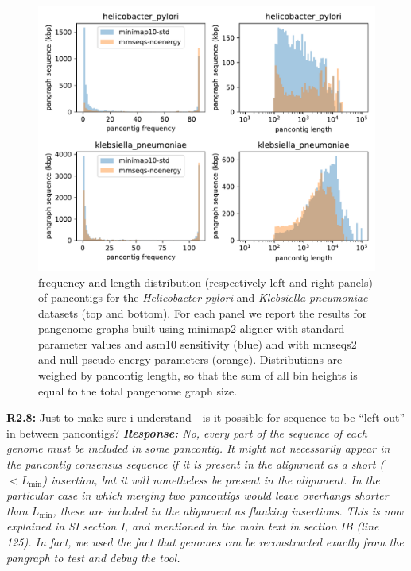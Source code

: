 \documentclass[aps,rmp,onecolumn]{revtex4-1}
\newcommand{\Lthr}{L_{\min}}
\newcommand{\reviewer}[2]{\textbf{#1:} #2\vskip 5mm}
\newcommand{\response}[1]{{\it {\color{response}\textbf{Response:} #1}}\vskip 5mm}
\newcommand{\SIgraph}{I}
\begin{document}
\begin{figure}[tb]
      \includegraphics[width=.7\textwidth]{figs_response/hp_vs_kp.pdf}
      \caption{frequency and length distribution (respectively left and right panels) of pancontigs for the \textit{Helicobacter pylori} and \textit{Klebsiella pneumoniae} datasets (top and bottom). For each panel we report the results for pangenome graphs built using minimap2 aligner with standard parameter values and asm10 sensitivity (blue) and with mmseqs2 and null pseudo-energy parameters (orange). Distributions are weighed by pancontig length, so that the sum of all bin heights is equal to the total pangenome graph size.}
      \label{fig:kp-vs-hp}
\end{figure}

\reviewer{R2.8}{Just to make sure i understand - is it possible for sequence to be ``left out'' in between pancontigs?}
\response{No, every part of the sequence of each genome must be included in some pancontig. 
It might not necessarily appear in the pancontig consensus sequence if it is present in the alignment as a short ($< \Lthr$) insertion, but it will nonetheless be present in the alignment. 
In the particular case in which merging two pancontigs would leave overhangs shorter than $\Lthr$, these are included in the alignment as flanking insertions. 
This is now explained in SI section {\SIgraph}, and mentioned in the main text in section IB (line 125).
In fact, we used the fact that genomes can be reconstructed exactly from the pangraph to test and debug the tool. }
\end{document}
